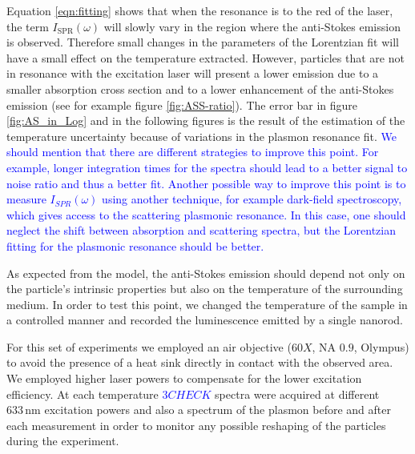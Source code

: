 \documentclass[journal=nalefd,manuscript=letter]{achemso}
\newcommand{\HI}[1]{\textcolor{blue}{#1}} %
\newcommand{\nm}{\ensuremath{\,\textrm{nm}}}
\begin{document}
Equation \ref{eqn:fitting} shows that when the resonance is to the red
of the laser, the term $I_\textrm{SPR}(\omega)$ will slowly vary in the region where the
anti-Stokes emission is observed. Therefore small changes in the parameters of
the Lorentzian fit will have a small effect on the temperature extracted.
However, particles that are not in resonance with the excitation laser will
present a lower emission due to a smaller absorption cross section and to a
lower enhancement of the anti-Stokes emission (see for example figure
\ref{fig:ASS-ratio}). 
The error bar in figure
\ref{fig:AS_in_Log} and in the following figures is the result of the estimation
of the temperature uncertainty because of variations in the plasmon resonance
fit. \HI{We should mention that there are different strategies to improve this point.
For example, longer integration times for the spectra should lead 
to a better signal to noise ratio and thus a better fit.
Another possible way to improve this point is to measure $I_{SPR}(\omega)$ 
using another technique, for example dark-field spectroscopy, which gives access to
the scattering plasmonic resonance. In this case, one should neglect the shift 
between absorption and scattering spectra, but the Lorentzian fitting for the 
plasmonic resonance should be better.}

As expected from the model, the anti-Stokes emission should depend not only on
the particle's intrinsic properties but also on the temperature of the
surrounding medium\cite{Konrad2013}. In order to test this point, we changed the
temperature of the sample in a controlled manner and recorded the luminescence
emitted by a single nanorod.

For this set of experiments we employed an air objective ($60X$, NA $0.9$,
Olympus) to avoid the presence of a heat sink directly in contact with the
observed area. We employed higher laser powers to compensate for the lower
excitation efficiency. At each temperature \HI{$3 CHECK$} spectra were acquired at different
$633\nm$ excitation powers and also a spectrum of the plasmon before and after
each measurement in order to monitor any possible reshaping of the particles
during the experiment.
\end{document}
